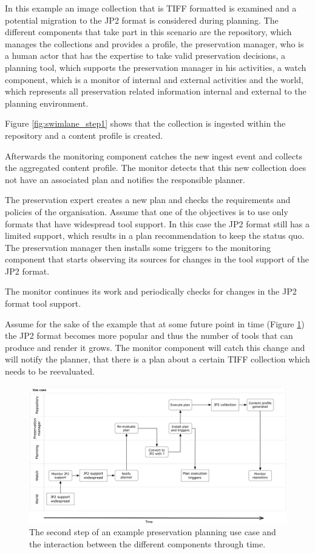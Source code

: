In this example an image collection that is TIFF formatted is examined and a potential migration to the JP2 format is considered during planning. The different components that take part in this scenario are the repository, which manages the collections and provides a profile, the preservation manager, who is a human actor that has the expertise to take valid preservation decisions, a planning tool, which supports the preservation manager in his activities, a watch component, which is a monitor of internal and external activities and the world, which represents all preservation related information internal and external to the planning environment.

Figure \ref{fig:swimlane_step1} shows that the collection is ingested within the repository and a content profile is created.

Afterwards the monitoring component catches the new ingest event and collects the aggregated content profile. The monitor detects that this new collection does not have an associated plan and notifies the responsible planner.

The preservation expert creates a new plan and checks the requirements and policies of the organisation. Assume that one of the objectives is to use only formats that have widespread tool support. In this case the JP2 format still has a limited support, which results in a plan recommendation to keep the status quo. The preservation manager then installs some triggers to the monitoring component that starts observing its sources for changes in the tool support of the JP2 format.

The monitor continues its work and periodically checks for changes in the JP2 format tool support.

Assume for the sake of the example that at some future point in time (Figure \ref{fig:swimlane_step2}) the JP2 format becomes more popular and thus the number of tools that can produce and render it grows. The monitor component will catch this change and will notify the planner, that there is a plan about a certain TIFF collection which needs to be reevaluated.

\begin{figure}[th]
\begin{center}
\includegraphics[width=6in]{figures/related/swimlane_step2.png}
\caption{The second step of an example preservation planning use case and the interaction between the different components through time.}
\label{fig:swimlane_step2}
\end{center}
\end{figure}

